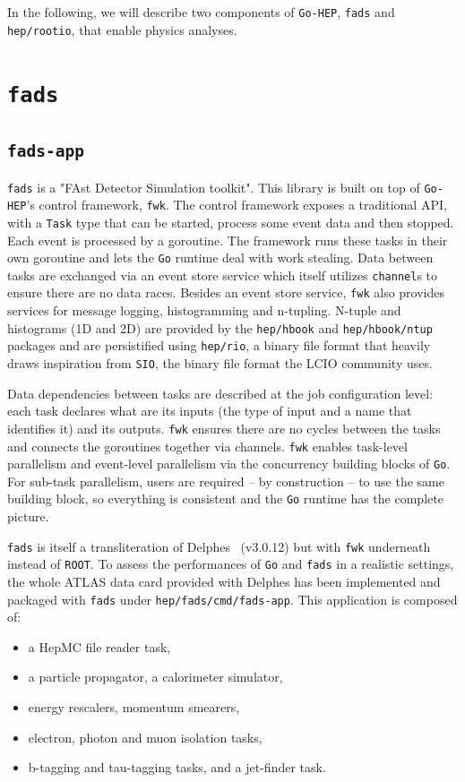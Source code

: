 \documentclass[a4paper]{jpconf}
\begin{document}
In the following, we will describe two components of \texttt{Go-HEP}, \texttt{fads} and \texttt{hep/rootio}, that enable physics analyses.

\section{\texttt{fads}}

\subsection{\texttt{fads-app}}

\texttt{fads} is a "FAst Detector Simulation toolkit".
This library is built on top of \texttt{Go-HEP}'s control framework, \texttt{fwk}.
The control framework exposes a traditional API, with a \texttt{Task} type that can be started, process some event data and then stopped.
Each event is processed by a goroutine.
The framework runs these tasks in their own goroutine and lets the \texttt{Go} runtime deal with work stealing.
Data between tasks are exchanged via an event store service which itself utilizes \texttt{channel}s to ensure there are no data races.
Besides an event store service, \texttt{fwk} also provides services for message logging, histogramming and n-tupling. 
N-tuple and histograms (1D and 2D) are provided by the \texttt{hep/hbook} and \texttt{hep/hbook/ntup} packages and are persistified using \texttt{hep/rio}, a binary file format that heavily draws inspiration from \texttt{SIO}, the binary file format the LCIO community uses.

Data dependencies between tasks are described at the job configuration level: each task declares what are its inputs (the type of input and a name that identifies it) and its outputs.
\texttt{fwk} ensures there are no cycles between the tasks and connects the goroutines together via channels.
\texttt{fwk} enables task-level parallelism and event-level parallelism via the concurrency building blocks of \texttt{Go}.
For sub-task parallelism, users are required -- by construction -- to use the same building block, so everything is consistent and the \texttt{Go} runtime has the complete picture.

\texttt{fads} is itself a transliteration of Delphes~\cite{ref-delphes} (v3.0.12) but with \texttt{fwk} underneath instead of \texttt{ROOT}.
To assess the performances of \texttt{Go} and \texttt{fads} in a realistic settings, the whole ATLAS data card provided with Delphes has been implemented and packaged with \texttt{fads} under \texttt{hep/fads/cmd/fads-app}.
This application is composed of:
\begin{itemize}
\item a HepMC file reader task,
\item a particle propagator, a calorimeter simulator,
\item energy rescalers, momentum smearers,
\item electron, photon and muon isolation tasks,
\item b-tagging and tau-tagging tasks, and a jet-finder task.
\end{itemize}
\end{document}
